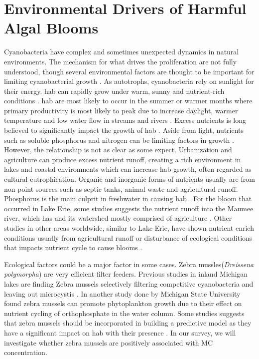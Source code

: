 \section{Environmental Drivers of Harmful Algal Blooms}
Cyanobacteria have complex and sometimes unexpected dynamics in natural environments. The mechanism for what drives the proliferation are not fully understood, though several environmental factors are thought to be important for limiting cyanobacterial growth \cite{dittmann_cyanobacterial_2012, noauthor_human_2012}. As autotrophs, cyanobacteria rely on sunlight for their energy. \gls{hab} can rapidly grow under warm, sunny and nutrient-rich conditions \cite{rastogi_cyanotoxin-microcystins:_2014}. \gls{hab} are most likely to occur in the summer or warmer months where primary productivity is most likely to peak due to increase daylight, warmer temperature and low water flow in streams and rivers \cite{vannote_river_1980,chapra_climate_2017-2}.
Excess nutrients is long believed to significantly impact the growth of \gls{hab} \cite{anderson_harmful_2002,anderson_harmful_2002}. Aside from light, nutrients such as soluble phosphorus and nitrogen can be limiting factors in growth \cite{tilman_phytoplankton_1982}. However, the relationship is not as clear as some expect. Urbanization and agriculture can produce excess nutrient runoff, creating a rich environment in lakes and coastal environments which can increase \gls{hab} growth, often regarded as cultural eutrophication\cite{smith_eutrophication_2009}.  Organic and inorganic forms of nutrients  usually are from non-point sources such as septic tanks, animal waste and agricultural runoff. Phosphorus is the main culprit in freshwater in causing \gls{hab} \cite{anderson_harmful_2002}. For the bloom that occurred in Lake Erie, some studies suggests the nutrient runoff into the  Maumee river, which has and its watershed mostly comprised of agriculture \cite{michalak_record-setting_2013, chaffin_accuracy_2018}. Other studies in other areas worldwide, similar to Lake Erie, have shown nutrient enrich conditions usually from agricultural runoff or disturbance of ecological conditions that impacts nutrient cycle to cause blooms \cite{ahn_evaluation_2011, ahn_rainfall_2002, anderson_harmful_2002, jiang_statistical_2008}.

Ecological factors could be a major factor in some cases. Zebra mussles(\emph{Dreissena polymorpha}) are very efficient filter feeders. Previous studies in inland Michigan lakes are finding Zebra mussels selectively filtering competitive cyanobacteria and leaving out microcystis \cite{vanderploeg_zebra_2001}. In another study done by Michigan State University \cite{raikow_dominance_2004} found zebra mussels can promote phytoplankton growth due to their effect on nutrient cycling of orthophosphate in the water column. Some studies suggests that zebra mussels should be incorporated in building a predictive model as they have a significant impact on \gls{hab} with their presence \cite{lavrentyev_effects_1995, knoll_invasive_2008, raikow_dominance_2004}.   In our survey, we will investigate whether zebra mussels are positively associated with MC concentration.

